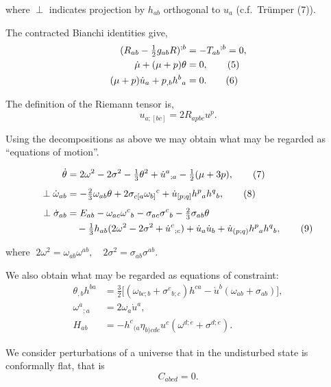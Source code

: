 where \(\perp\) indicates projection by \(h_{ab}\) orthogonal to \(u_{a}\) (c.f.\ Trümper (7)).  

\medskip

The contracted Bianchi identities give,
\begin{align}
(R_{ab} - \tfrac{1}{2} g_{ab} R)^{;b} &= - T_{ab}{}^{;b} = 0, \notag \\
\dot{\mu} + (\mu + p) \theta &= 0, \tag{5} \\
(\mu + p) \dot{u}_{a} + p_{,b} h^{b}{}_{a} &= 0. \tag{6}
\end{align}

The definition of the Riemann tensor is,
\[
u_{a;[bc]} = 2 R_{a p b c} u^{p}.
\]

Using the decompositions as above we may obtain what may be regarded 
as ``equations of motion''.

\begin{align}
\dot{\theta} &= 2 \omega^{2} - 2 \sigma^{2} - \tfrac{1}{3} \theta^{2} + \dot{u}^{a}{}_{;a} 
- \tfrac{1}{2} (\mu + 3p), \tag{7} \\[1ex]
\perp \dot{\omega}_{ab} &= - \tfrac{2}{3} \omega_{ab} \theta 
+ 2 \sigma_{c[a} \omega_{b]}{}^{c} 
+ \dot{u}_{[p;q]} h^{p}{}_{a} h^{q}{}_{b}, \tag{8} \\[1ex]
\perp \dot{\sigma}_{ab} &= E_{ab} - \omega_{ac} \omega^{c}{}_{b} - \sigma_{ac} \sigma^{c}{}_{b} 
- \tfrac{2}{3} \sigma_{ab} \theta \notag \\
&\quad - \tfrac{1}{3} h_{ab} (2 \omega^{2} - 2 \sigma^{2} + \dot{u}^{c}{}_{;c}) 
+ \dot{u}_{a} \dot{u}_{b} 
+ \dot{u}_{(p;q)} h^{p}{}_{a} h^{q}{}_{b}, \tag{9}
\end{align}

where \(\; 2\omega^{2} = \omega_{ab} \omega^{ab}, \quad 2\sigma^{2} = \sigma_{ab} \sigma^{ab}\).

\medskip

We also obtain what may be regarded as equations of constraint:
\begin{align}
\theta_{,b} h^{ba} &= \tfrac{3}{2} \Big[ 
  (\omega_{bc;b} + \sigma^{c}{}_{b;c}) h^{ca} 
  - \dot{u}^{b} (\omega_{ab} + \sigma_{ab}) \Big], \tag{10} \\[1ex]
\omega^{a}{}_{;a} &= 2 \omega_{a} \dot{u}^{a}, \tag{11} \\[1ex]
H_{ab} &= - h^{c}{}_{(a} \eta_{b)cde} u^{c} 
\left( \omega^{d;e} + \sigma^{d;e} \right). \tag{12}
\end{align}

\medskip

We consider perturbations of a universe that in the undisturbed state 
is conformally flat, that is
\[
C_{abcd} = 0.
\]

